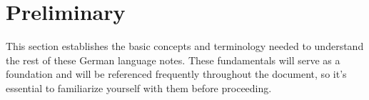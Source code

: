\section{Preliminary}\label{sec:preliminary}

This section establishes the basic concepts and terminology needed to understand the rest of these German language notes. These fundamentals will serve as a foundation and will be referenced frequently throughout the document, so it's essential to familiarize yourself with them before proceeding.
